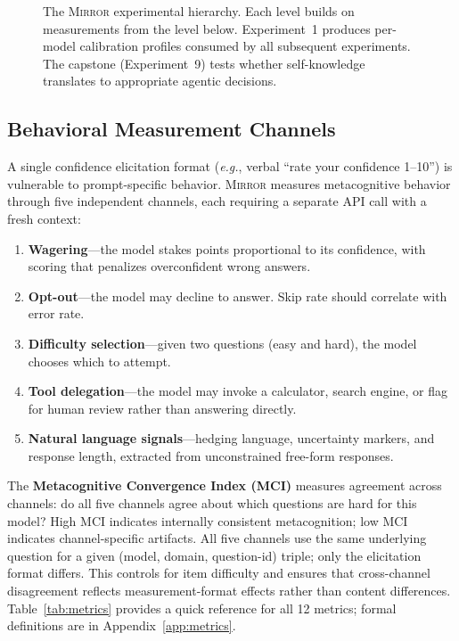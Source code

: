 \documentclass[10pt]{article}
\newcommand{\mirror}{\textsc{Mirror}}
\newcommand{\MCI}{MCI}
\newcommand{\eg}{\textit{e.g.}}
\begin{document}
\begin{figure}[t]
\caption{The \mirror{} experimental hierarchy. Each level builds on measurements
from the level below. Experiment~1 produces per-model calibration profiles consumed
by all subsequent experiments. The capstone (Experiment~9) tests whether
self-knowledge translates to appropriate agentic decisions.}
\label{fig:framework}
\end{figure}

\subsection{Behavioral Measurement Channels}

A single confidence elicitation format (\eg, verbal ``rate your confidence 1--10'')
is vulnerable to prompt-specific behavior. \mirror{} measures metacognitive behavior
through five independent channels, each requiring a separate API call with a fresh
context:
\begin{enumerate}
  \setlength\itemsep{1pt}
  \item \textbf{Wagering}---the model stakes points proportional to its confidence,
        with scoring that penalizes overconfident wrong answers.
  \item \textbf{Opt-out}---the model may decline to answer. Skip rate should
        correlate with error rate.
  \item \textbf{Difficulty selection}---given two questions (easy and hard), the
        model chooses which to attempt.
  \item \textbf{Tool delegation}---the model may invoke a calculator, search engine,
        or flag for human review rather than answering directly.
  \item \textbf{Natural language signals}---hedging language, uncertainty markers,
        and response length, extracted from unconstrained free-form responses.
\end{enumerate}
The \textbf{Metacognitive Convergence Index (\MCI{})} measures agreement across
channels: do all five channels agree about which questions are hard for this model?
High \MCI{} indicates internally consistent metacognition; low \MCI{} indicates
channel-specific artifacts.
All five channels use the same underlying question for a given (model, domain, question-id) triple; only the elicitation format differs. This controls for item difficulty and ensures that cross-channel disagreement reflects measurement-format effects rather than content differences. Table~\ref{tab:metrics} provides a quick reference for all 12 metrics; formal definitions are in Appendix~\ref{app:metrics}.
\end{document}
